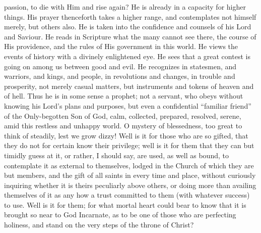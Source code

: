 passion, to die with Him and rise again? He is already in a capacity
for higher things. His prayer thenceforth takes a higher range, and
contemplates not himself merely, but others also. He is taken into the
confidence and counsels of his Lord and Saviour. He reads in Scripture
what the many cannot see there, the course of His providence, and the
rules of His government in this world. He views the events of history
with a divinely enlightened eye. He sees that a great contest is going
on among us between good and evil. He recognizes in statesmen, and
warriors, and kings, and people, in revolutions and changes, in
trouble and prosperity, not merely casual matters, but instruments and
tokens of heaven and of hell. Thus he is in some sense a prophet; not
a servant, who obeys without knowing his Lord's plans and purposes,
but even a confidential ``familiar friend'' of the
Only-begotten Son of God, calm, collected, prepared, resolved, serene,
amid this restless and unhappy world. O mystery of blessedness, too
great to think of steadily, lest we grow dizzy! Well is it for those
who are so gifted, that they do not for certain know their privilege;
well is it for them that they can but timidly guess at it, or rather,
I should say, are used, as well as bound, to contemplate it as
external to themselves, lodged in the Church of which they are but
members, and the gift of all saints in every time and place, without
curiously inquiring whether it is theirs peculiarly above others, or
doing more than availing themselves of it as any how a trust committed
to them (with whatever success) to use. Well is it for them; for what
mortal heart could bear to know that it is brought so near to God
Incarnate, as to be one of those who are perfecting holiness, and
stand on the very steps of the throne of Christ?

